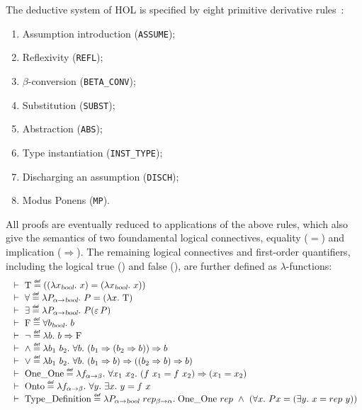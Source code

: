 The deductive system of HOL is specified by eight primitive
derivative rules~\cite{hollogic}:
\begin{enumerate}
\item Assumption introduction (\texttt{ASSUME});
\item Reflexivity (\texttt{REFL});
\item $\beta$-conversion (\texttt{BETA\_CONV});
\item Substitution (\texttt{SUBST});
\item Abstraction (\texttt{ABS});
\item Type instantiation (\texttt{INST\_TYPE});
\item Discharging an assumption (\texttt{DISCH});
\item Modus Ponens (\texttt{MP}).
\end{enumerate}
All proofs are eventually reduced to applications of the above rules,
which also give the semantics of two foundamental
logical connectives,  equality ($=$) and implication
($\Rightarrow$). The remaining logical connectives and first-order
quantifiers, including the logical true () and false (), are
further defined as $\lambda$-functions: 
\begin{equation*}
\begin{array}{l}
\turn \T \HOLTokenDefEquality ((\lquant{x_{\ty{bool}}}x) =
               (\lquant{x_{\ty{bool}}}x))    \\
\turn \forall \HOLTokenDefEquality \lquant{P_{\alpha\fun\ty{bool}}} P =
                    (\lquant{x}\T ) \\
\turn \exists \HOLTokenDefEquality \lquant{P_{\alpha\fun\ty{bool}}} P({\hilbert}\, P) \\
\turn \F \HOLTokenDefEquality \uquant{b_{\ty{bool}}} b  \\
\turn \neg \HOLTokenDefEquality \lquant{b} b \imp \F \\
\turn {\wedge}  \HOLTokenDefEquality  \lquant{b_1\ b_2}\uquant{b} (b_1\imp (b_2 \imp b)) \imp b \\
\turn {\vee} \HOLTokenDefEquality \lquant{b_1\ b_2}\uquant{b} (b_1 \imp b)\imp ((b_2 \imp b) \imp b) \\
\turn \OneOne \HOLTokenDefEquality \lquant{f_{\alpha \fun\beta}}\uquant{x_1\ x_2}
                    (f\ x_1 = f\ x_2)  \imp (x_1 = x_2) \\
\turn \Onto \HOLTokenDefEquality \lquant{f_{\alpha\fun\beta}}
                  \uquant{y}\equant{x} y = f\ x \\
\turn \TyDef \HOLTokenDefEquality \lambda P_{\alpha\fun\ty{bool}}\
                  rep_{\beta\fun\alpha}.\;
                  \OneOne\ rep \ \wedge{}\  (\uquant{x}P x = (\equant{y} x = rep\ y))
\end{array}
\end{equation*}
